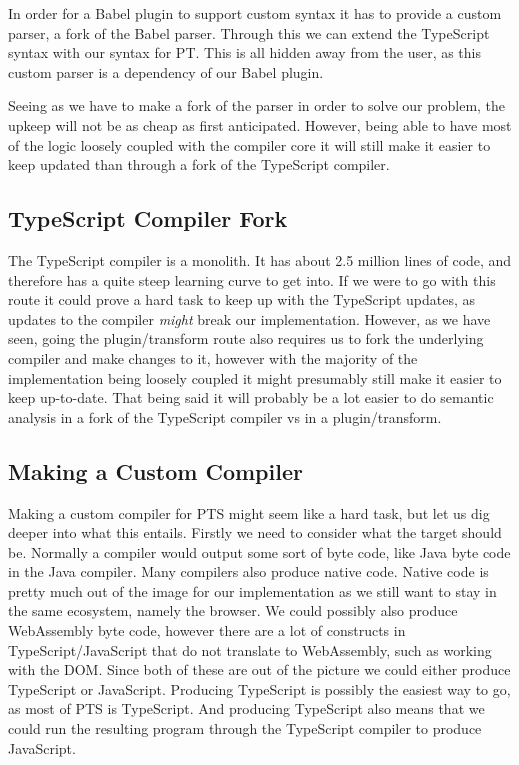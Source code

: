 In order for a Babel plugin to support custom syntax it has to provide a custom parser, a fork of the Babel parser.
Through this we can extend the TypeScript syntax with our syntax for PT\@.
This is all hidden away from the user, as this custom parser is a dependency of our Babel plugin.

Seeing as we have to make a fork of the parser in order to solve our problem, the upkeep will not be as cheap as first anticipated.
However, being able to have most of the logic loosely coupled with the compiler core it will still make it easier to keep updated than through a fork of the TypeScript compiler.


\subsection{TypeScript Compiler Fork}\label{subsec:typescript-compiler-fork}

The TypeScript compiler is a monolith.
It has about 2.5 million lines of code, and therefore has a quite steep learning curve to get into.
If we were to go with this route it could prove a hard task to keep up with the TypeScript updates, as updates to the compiler \textit{might} break our implementation.
However, as we have seen, going the plugin/transform route also requires us to fork the underlying compiler and make changes to it, however with the majority of the implementation being loosely coupled it might presumably still make it easier to keep up-to-date.
That being said it will probably be a lot easier to do semantic analysis in a fork of the TypeScript compiler vs in a plugin/transform.

\subsection{Making a Custom Compiler}\label{subsec:making-a-custom-compiler}

Making a custom compiler for PTS might seem like a hard task, but let us dig deeper into what this entails.
Firstly we need to consider what the target should be.
Normally a compiler would output some sort of byte code, like Java byte code in the Java compiler.
Many compilers also produce native code.
Native code is pretty much out of the image for our implementation as we still want to stay in the same ecosystem, namely the browser.
We could possibly also produce WebAssembly byte code, however there are a lot of constructs in TypeScript/JavaScript that do not translate to WebAssembly, such as working with the DOM\@.
Since both of these are out of the picture we could either produce TypeScript or JavaScript.
Producing TypeScript is possibly the easiest way to go, as most of PTS is TypeScript.
And producing TypeScript also means that we could run the resulting program through the TypeScript compiler to produce JavaScript.

